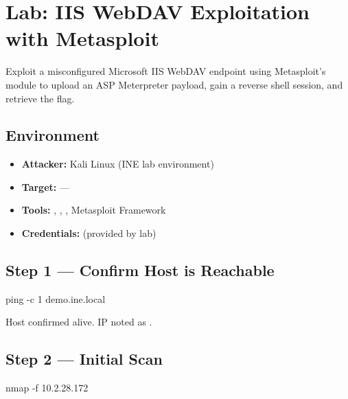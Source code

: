 \chapter{Lab: IIS WebDAV Exploitation with Metasploit}
\label{lab:webdav_metasploit}

\begin{notebox}
Exploit a misconfigured Microsoft IIS WebDAV endpoint using Metasploit's
 module to upload an ASP Meterpreter payload,
gain a reverse shell session, and retrieve the flag.
\end{notebox}

\section*{Environment}
\begin{itemize}
  \item \textbf{Attacker:} Kali Linux (INE lab environment)
  \item \textbf{Target:}  --- 
  \item \textbf{Tools:} , , , Metasploit Framework
  \item \textbf{Credentials:}  (provided by lab)
\end{itemize}

\section*{Step 1 --- Confirm Host is Reachable}

\begin{termbox}
ping -c 1 demo.ine.local
\end{termbox}

Host confirmed alive. IP noted as .


\section*{Step 2 --- Initial Scan}

\begin{termbox}
nmap -f 10.2.28.172
\end{termbox}

